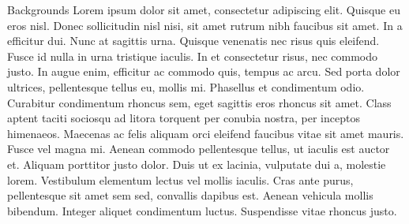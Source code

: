 \begin{section}{Backgrounds}
Lorem ipsum dolor sit amet, consectetur adipiscing elit. Quisque eu eros nisl. Donec sollicitudin nisl nisi, sit amet rutrum nibh faucibus sit amet. In a efficitur dui. Nunc at sagittis urna. Quisque venenatis nec risus quis eleifend. Fusce id nulla in urna tristique iaculis. In et consectetur risus, nec commodo justo. In augue enim, efficitur ac commodo quis, tempus ac arcu. Sed porta dolor ultrices, pellentesque tellus eu, mollis mi. Phasellus et condimentum odio. Curabitur condimentum rhoncus sem, eget sagittis eros rhoncus sit amet. Class aptent taciti sociosqu ad litora torquent per conubia nostra, per inceptos himenaeos. Maecenas ac felis aliquam orci eleifend faucibus vitae sit amet mauris. Fusce vel magna mi. Aenean commodo pellentesque tellus, ut iaculis est auctor et.
Aliquam porttitor justo dolor. Duis ut ex lacinia, vulputate dui a, molestie lorem. Vestibulum elementum lectus vel mollis iaculis. Cras ante purus, pellentesque sit amet sem sed, convallis dapibus est. Aenean vehicula mollis bibendum. Integer aliquet condimentum luctus. Suspendisse vitae rhoncus justo.
\end{section}

